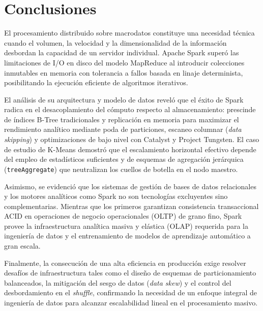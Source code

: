 \documentclass[conference,a4paper]{IEEEtran}
\begin{document}
\section{Conclusiones}
\label{sec:conclusiones}

El procesamiento distribuido sobre macrodatos constituye una necesidad técnica cuando el volumen, la velocidad y la dimensionalidad de la información desbordan la capacidad de un servidor individual. Apache Spark superó las limitaciones de I/O en disco del modelo MapReduce al introducir colecciones inmutables en memoria con tolerancia a fallos basada en linaje determinista, posibilitando la ejecución eficiente de algoritmos iterativos.

El análisis de su arquitectura y modelo de datos reveló que el éxito de Spark radica en el desacoplamiento del cómputo respecto al almacenamiento: prescinde de índices B-Tree tradicionales y replicación en memoria para maximizar el rendimiento analítico mediante poda de particiones, escaneo columnar (\textit{data skipping}) y optimizaciones de bajo nivel con Catalyst y Project Tungsten. El caso de estudio de K-Means demostró que el escalamiento horizontal efectivo depende del empleo de estadísticos suficientes y de esquemas de agregación jerárquica (\texttt{treeAggregate}) que neutralizan los cuellos de botella en el nodo maestro.

Asimismo, se evidenció que los sistemas de gestión de bases de datos relacionales y los motores analíticos como Spark no son tecnologías excluyentes sino complementarias. Mientras que los primeros garantizan consistencia transaccional ACID en operaciones de negocio operacionales (OLTP) de grano fino, Spark provee la infraestructura analítica masiva y elástica (OLAP) requerida para la ingeniería de datos y el entrenamiento de modelos de aprendizaje automático a gran escala.

Finalmente, la consecución de una alta eficiencia en producción exige resolver desafíos de infraestructura tales como el diseño de esquemas de particionamiento balanceados, la mitigación del sesgo de datos (\textit{data skew}) y el control del desbordamiento en el \textit{shuffle}, confirmando la necesidad de un enfoque integral de ingeniería de datos para alcanzar escalabilidad lineal en el procesamiento masivo.
\end{document}
